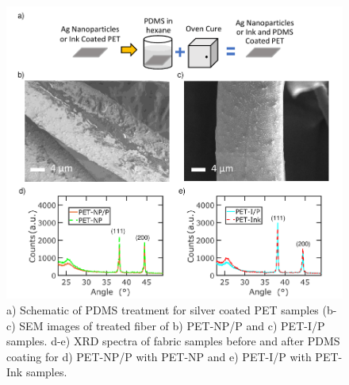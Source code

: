 \documentclass[journal=jacsat,manuscript=article]{achemso}
\begin{document}
\begin{figure}[H]
       \centering
    \includegraphics[width= \linewidth]{Figures/fig3_char.pdf}
\caption[Characterization of samples with PDMS]{a) Schematic of PDMS treatment for silver coated PET samples (b-c) SEM images of treated fiber of b) PET-NP/P and c) PET-I/P samples. d-e) XRD spectra of fabric samples before and after PDMS coating for d) PET-NP/P with PET-NP and e) PET-I/P with PET-Ink samples.}

\label{fig:wet}
\end{figure}
\end{document}
